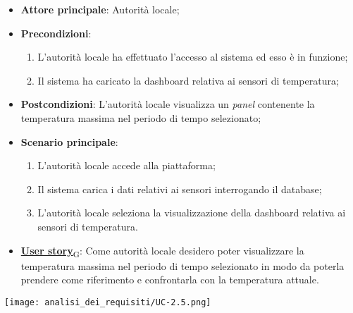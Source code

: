 \begin{itemize}
	\item \textbf{Attore principale}: Autorità locale;
	\item \textbf{Precondizioni}:
	      \begin{enumerate}
		      \item L'autorità locale ha effettuato l'accesso al sistema ed esso è in funzione;
		      \item Il sistema ha caricato la dashboard relativa ai sensori di temperatura;
	      \end{enumerate}
	\item \textbf{Postcondizioni}: L'autorità locale visualizza un \textit{panel} contenente la temperatura massima nel periodo di tempo selezionato;
	\item \textbf{Scenario principale}:
	      \begin{enumerate}
		      \item L'autorità locale accede alla piattaforma;
		      \item Il sistema carica i dati relativi ai sensori interrogando il database;
		      \item L'autorità locale seleziona la visualizzazione della dashboard relativa ai sensori di temperatura.
	      \end{enumerate}
	\item \href{https://7last.github.io/docs/rtb/documentazione-interna/glossario\#user-story}{\textbf{User story}\textsubscript{G}}:
	      Come autorità locale desidero poter visualizzare la temperatura massima nel periodo di tempo selezionato
	      in modo da poterla prendere come riferimento e confrontarla con la temperatura attuale.
\end{itemize}
\begin{center}
	\texttt{[image: analisi\_dei\_requisiti/UC-2.5.png]}
\end{center}

